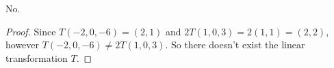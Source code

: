 \begin{Exercise}
	\begin{answer}
		No.
	\end{answer}
	\begin{proof}
		Since $T(-2,0,-6) = (2,1)$ and $2T(1,0,3) = 2(1,1) = (2,2)$, however $T(-2,0,-6) \neq 2T(1,0,3)$. So there doesn't exist the linear transformation $T$.
	\end{proof}
\end{Exercise}